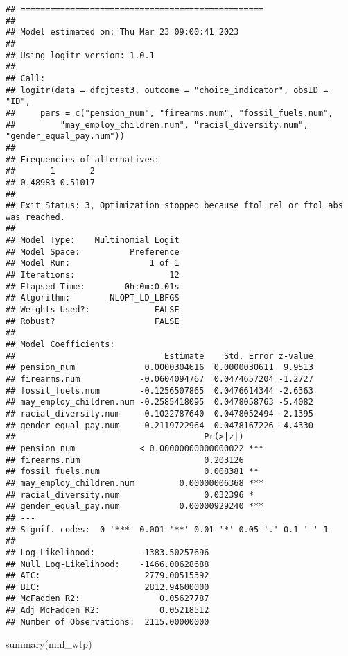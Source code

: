 \documentclass[
]{article}
\newenvironment{Shaded}{\begin{snugshade}}{\end{snugshade}}
\newcommand{\FunctionTok}[1]{\textcolor[rgb]{0.00,0.00,0.00}{#1}}
\newcommand{\NormalTok}[1]{#1}
\begin{document}
\begin{verbatim}
## =================================================
## 
## Model estimated on: Thu Mar 23 09:00:41 2023 
## 
## Using logitr version: 1.0.1 
## 
## Call:
## logitr(data = dfcjtest3, outcome = "choice_indicator", obsID = "ID", 
##     pars = c("pension_num", "firearms.num", "fossil_fuels.num", 
##         "may_employ_children.num", "racial_diversity.num", "gender_equal_pay.num"))
## 
## Frequencies of alternatives:
##       1       2 
## 0.48983 0.51017 
## 
## Exit Status: 3, Optimization stopped because ftol_rel or ftol_abs was reached.
##                                 
## Model Type:    Multinomial Logit
## Model Space:          Preference
## Model Run:                1 of 1
## Iterations:                   12
## Elapsed Time:        0h:0m:0.01s
## Algorithm:        NLOPT_LD_LBFGS
## Weights Used?:             FALSE
## Robust?                    FALSE
## 
## Model Coefficients: 
##                              Estimate    Std. Error z-value
## pension_num              0.0000304616  0.0000030611  9.9513
## firearms.num            -0.0604094767  0.0474657204 -1.2727
## fossil_fuels.num        -0.1256507865  0.0476614344 -2.6363
## may_employ_children.num -0.2585418095  0.0478058763 -5.4082
## racial_diversity.num    -0.1022787640  0.0478052494 -2.1395
## gender_equal_pay.num    -0.2119722964  0.0478167226 -4.4330
##                                      Pr(>|z|)    
## pension_num             < 0.00000000000000022 ***
## firearms.num                         0.203126    
## fossil_fuels.num                     0.008381 ** 
## may_employ_children.num         0.00000006368 ***
## racial_diversity.num                 0.032396 *  
## gender_equal_pay.num            0.00000929240 ***
## ---
## Signif. codes:  0 '***' 0.001 '**' 0.01 '*' 0.05 '.' 0.1 ' ' 1
##                                       
## Log-Likelihood:         -1383.50257696
## Null Log-Likelihood:    -1466.00628688
## AIC:                     2779.00515392
## BIC:                     2812.94600000
## McFadden R2:                0.05627787
## Adj McFadden R2:            0.05218512
## Number of Observations:  2115.00000000
\end{verbatim}

\begin{Shaded}
\begin{Highlighting}[]
\FunctionTok{summary}\NormalTok{(mnl\_wtp)}
\end{Highlighting}
\end{Shaded}
\end{document}
